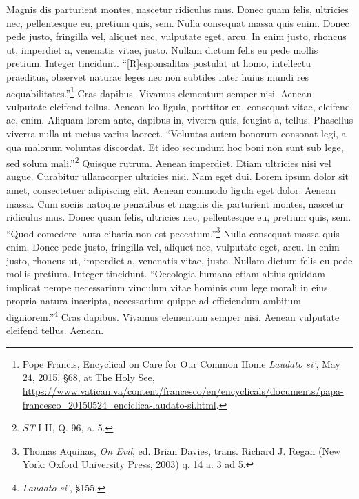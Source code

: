 \documentclass[
    12pt,
    letterpaper,
    oneside,
    noraggedright
]{turabian-researchpaper}
\begin{document}
Magnis dis parturient montes, nascetur ridiculus mus. Donec quam felis,
ultricies nec, pellentesque eu, pretium quis, sem. Nulla consequat massa
quis enim. Donec pede justo, fringilla vel, aliquet nec, vulputate eget,
arcu. In enim justo, rhoncus ut, imperdiet a, venenatis vitae, justo.
Nullam dictum felis eu pede mollis pretium. Integer tincidunt.
``{[}R{]}esponsalitas postulat ut homo, intellectu praeditus, observet
naturae leges nec non subtiles inter huius mundi res
aequabilitates.''\footnote{Pope Francis, {Encyclical on Care for Our
  Common Home \emph{Laudato si'},} May 24, 2015, §68, at The Holy See,
  \url{https://www.vatican.va/content/francesco/en/encyclicals/documents/papa-francesco_20150524_enciclica-laudato-si.html}.}
Cras dapibus. Vivamus elementum semper nisi. Aenean vulputate eleifend
tellus. Aenean leo ligula, porttitor eu, consequat vitae, eleifend ac,
enim. Aliquam lorem ante, dapibus in, viverra quis, feugiat a, tellus.
Phasellus viverra nulla ut metus varius laoreet. ``Voluntas autem
bonorum consonat legi, a qua malorum voluntas discordat. Et ideo
secundum hoc boni non sunt sub lege, sed solum mali.''\footnote{\emph{ST}
  I-II, Q. 96, a. 5.} Quisque rutrum. Aenean imperdiet. Etiam ultricies
nisi vel augue. Curabitur ullamcorper ultricies nisi. Nam eget dui.
Lorem ipsum dolor sit amet, consectetuer adipiscing elit. Aenean commodo
ligula eget dolor. Aenean massa. Cum sociis natoque penatibus et magnis
dis parturient montes, nascetur ridiculus mus. Donec quam felis,
ultricies nec, pellentesque eu, pretium quis, sem. ``Quod comedere lauta
cibaria non est peccatum.''\footnote{Thomas Aquinas, \emph{On Evil}, ed.
  Brian Davies, trans. Richard J. Regan (New York: Oxford University
  Press, 2003) q. 14 a. 3 ad 5.} Nulla consequat massa quis enim. Donec
pede justo, fringilla vel, aliquet nec, vulputate eget, arcu. In enim
justo, rhoncus ut, imperdiet a, venenatis vitae, justo. Nullam dictum
felis eu pede mollis pretium. Integer tincidunt. ``Oecologia humana
etiam altius quiddam implicat nempe necessarium vinculum vitae hominis
cum lege morali in eius propria natura inscripta, necessarium quippe ad
efficiendum ambitum digniorem.''\footnote{{\emph{Laudato si'},} §155.}
Cras dapibus. Vivamus elementum semper nisi. Aenean vulputate eleifend
tellus. Aenean.
\end{document}
